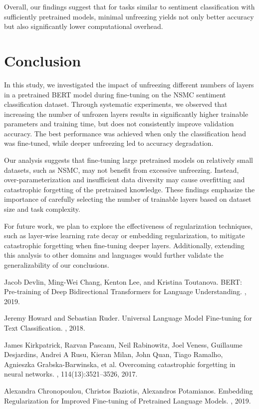 \documentclass{article}
\begin{document}
Overall, our findings suggest that for tasks similar to sentiment classification with sufficiently pretrained models, minimal unfreezing yields not only better accuracy but also significantly lower computational overhead.


\section{Conclusion}

In this study, we investigated the impact of unfreezing different numbers of layers in a pretrained BERT model during fine-tuning on the NSMC sentiment classification dataset. Through systematic experiments, we observed that increasing the number of unfrozen layers results in significantly higher trainable parameters and training time, but does not consistently improve validation accuracy. The best performance was achieved when only the classification head was fine-tuned, while deeper unfreezing led to accuracy degradation.

Our analysis suggests that fine-tuning large pretrained models on relatively small datasets, such as NSMC, may not benefit from excessive unfreezing. Instead, over-parameterization and insufficient data diversity may cause overfitting and catastrophic forgetting of the pretrained knowledge. These findings emphasize the importance of carefully selecting the number of trainable layers based on dataset size and task complexity.

For future work, we plan to explore the effectiveness of regularization techniques, such as layer-wise learning rate decay or embedding regularization, to mitigate catastrophic forgetting when fine-tuning deeper layers. Additionally, extending this analysis to other domains and languages would further validate the generalizability of our conclusions.


\begin{thebibliography}{99}

Jacob Devlin, Ming-Wei Chang, Kenton Lee, and Kristina Toutanova.
\newblock BERT: Pre-training of Deep Bidirectional Transformers for Language Understanding.
, 2019.

Jeremy Howard and Sebastian Ruder.
\newblock Universal Language Model Fine-tuning for Text Classification.
, 2018.

James Kirkpatrick, Razvan Pascanu, Neil Rabinowitz, Joel Veness, Guillaume Desjardins, Andrei A Rusu, Kieran Milan, John Quan, Tiago Ramalho, Agnieszka Grabska-Barwinska, et al.
\newblock Overcoming catastrophic forgetting in neural networks.
, 114(13):3521–3526, 2017.

Alexandra Chronopoulou, Christos Baziotis, Alexandros Potamianos.
\newblock Embedding Regularization for Improved Fine-tuning of Pretrained Language Models.
, 2019.

\end{thebibliography}
\end{document}
